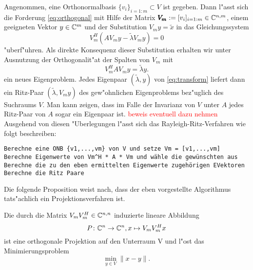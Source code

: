 Angenommen, eine Orthonormalbasis $\{v_i\}_{i=1:m}\subset V$ ist gegeben.
Dann l"asst sich die Forderung \eqref{eq:orthogonal} mit Hilfe der Matrix $\pmb{V_m} :=[v_i]_{i=1:m}\in\mathbb{C}^{n,m}$, einem geeigneten Vektor
$y\in\mathbb{C}^m$ und der Substitution $V_m y=\widetilde{x}$ in das Gleichungssystem
\[
V_m^H(AV_m y - \widetilde{\lambda} V_m y) = 0
\]
"uberf"uhren. Als direkte Konsequenz dieser Substitution erhalten wir unter Ausnutzung der Orthogonalit"at der Spalten von $V_m$ mit
\begin{equation}\label{eq:transform}
V_m^H A V_m y = \widetilde{\lambda}y.
\end{equation}
ein neues Eigenproblem. Jedes Eigenpaar $(\widetilde{\lambda},y)$ von \eqref{eq:transform}
liefert dann ein Ritz-Paar $(\widetilde{\lambda}, V_m y)$ des gew"ohnlichen
Eigenproblems bez"uglich des Suchraums $V$. Man kann zeigen, dass im Falle der Invarianz
von $V$ unter $A$ jedes Ritz-Paar von $A$ sogar ein Eigenpaar ist. \textcolor{red}{beweis eventuell dazu nehmen}\\

Ausgehend von diesen "Uberlegungen l"asst sich das Rayleigh-Ritz-Verfahren wie folgt
beschreiben:

\begin{lstlisting}[caption = Rayleigh-Ritz-Verfahren (Vgl. Saad Algo. 4.5), captionpos=b]
Berechne eine ONB {v1,...,vm} von V und setze Vm = [v1,...,vm]
Berechne Eigenwerte von Vm^H * A * Vm und wähle die gewünschten aus
Berechne die zu den eben ermittelten Eigenwerte zugehörigen EVektoren
Berechne die Ritz Paare
\end{lstlisting}

Die folgende Proposition weist nach, dass der eben vorgestellte Algorithmus tats"achlich
ein Projektionsverfahren ist.

\begin{prop}
Die durch die Matrix $V_m V_m^H \in \mathbb{C}^{n,n}$ induzierte lineare Abbildung
\[
P\colon \mathbb{C}^n \to \mathbb{C}^n, x\mapsto V_m V_m^H x
\]
ist eine orthogonale Projektion auf den Unterraum V und l"ost das Minimierungsproblem
\[
\min_{y\in V}\|x-y\|.
\]
\end{prop}

